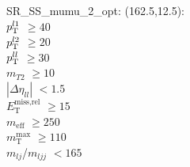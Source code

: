 SR\_SS\_mumu\_2\_opt: (162.5,12.5): \\
$p_{\text{T}}^{l1}$ $\geq 40$ \\
$p_{\text{T}}^{l2}$ $\geq 20$ \\
$p_{\text{T}}^{ll}$ $\geq 30$ \\
$m_{T2}$ $\geq 10$ \\
$|\Delta\eta_{ll}|$ $<1.5$ \\
$E_{\text{T}}^{\text{miss,rel}}$ $\geq 15$ \\
$m_{\text{eff}}$ $\geq 250$ \\
$m_{\text{T}}^{\text{max}}$ $\geq 110$ \\
$m_{lj}$/$m_{ljj}$ $<165$ \\
